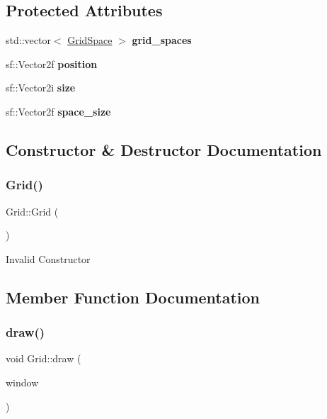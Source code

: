 \subsection*{Protected Attributes}
\begin{DoxyCompactItemize}
\item 
\mbox{\label{classGrid_ab42626190820988b4d0eae4f8967ffe6}} 
std\+::vector$<$ \hyperlink{classGridSpace}{Grid\+Space} $>$ {\bfseries grid\+\_\+spaces}
\item 
\mbox{\label{classGrid_a796d0aeab0f020d7db9bff504934418e}} 
sf\+::\+Vector2f {\bfseries position}
\item 
\mbox{\label{classGrid_ad7aee43ef40b14619a2e05745d2b93df}} 
sf\+::\+Vector2i {\bfseries size}
\item 
\mbox{\label{classGrid_acbf3579d4b25a42e9ce989c2f940bfd7}} 
sf\+::\+Vector2f {\bfseries space\+\_\+size}
\end{DoxyCompactItemize}


\subsection{Constructor \& Destructor Documentation}
\mbox{\label{classGrid_a4ac9ff4f63552b4c61ff90fcb35ad66c}} 
\subsubsection{\texorpdfstring{Grid()}{Grid()}}
{\footnotesize\ttfamily Grid\+::\+Grid (\begin{DoxyParamCaption}{ }\end{DoxyParamCaption})}

Invalid Constructor 

\subsection{Member Function Documentation}
\mbox{\label{classGrid_a9b42b1d0dcfc434d790b11faf4b461ce}} 
\subsubsection{\texorpdfstring{draw()}{draw()}\hspace{0.1cm}{\footnotesize\ttfamily [1/2]}}
{\footnotesize\ttfamily void Grid\+::draw (\begin{DoxyParamCaption}\item[{sf\+::\+Render\+Window \&}]{window }\end{DoxyParamCaption})}

